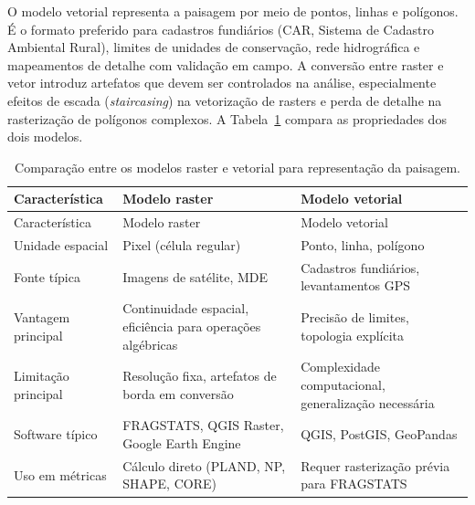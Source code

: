 \documentclass[
  portuguese,
  11pt,
  a4paper,
  open=any]{scrbook}
\begin{document}
O modelo vetorial representa a paisagem por meio de pontos, linhas e
polígonos. É o formato preferido para cadastros fundiários (CAR, Sistema
de Cadastro Ambiental Rural), limites de unidades de conservação, rede
hidrográfica e mapeamentos de detalhe com validação em campo. A
conversão entre raster e vetor introduz artefatos que devem ser
controlados na análise, especialmente efeitos de escada
(\emph{staircasing}) na vetorização de rasters e perda de detalhe na
rasterização de polígonos complexos. A Tabela~\ref{tbl-raster-vetor}
compara as propriedades dos dois modelos.

\begin{longtable}[]{@{}
  >{\raggedright\arraybackslash}p{}
  >{\raggedright\arraybackslash}p{}
  >{\raggedright\arraybackslash}p{}@{}}
\caption{Comparação entre os modelos raster e vetorial para
representação da paisagem.}\label{tbl-raster-vetor}\tabularnewline
\toprule\noalign{}
\begin{minipage}[b]{\linewidth}\raggedright
Característica
\end{minipage} & \begin{minipage}[b]{\linewidth}\raggedright
Modelo raster
\end{minipage} & \begin{minipage}[b]{\linewidth}\raggedright
Modelo vetorial
\end{minipage} \\
\midrule\noalign{}
\endfirsthead
\toprule\noalign{}
\begin{minipage}[b]{\linewidth}\raggedright
Característica
\end{minipage} & \begin{minipage}[b]{\linewidth}\raggedright
Modelo raster
\end{minipage} & \begin{minipage}[b]{\linewidth}\raggedright
Modelo vetorial
\end{minipage} \\
\midrule\noalign{}
\endhead
\bottomrule\noalign{}
\endlastfoot
Unidade espacial & Pixel (célula regular) & Ponto, linha, polígono \\
Fonte típica & Imagens de satélite, MDE & Cadastros fundiários,
levantamentos GPS \\
Vantagem principal & Continuidade espacial, eficiência para operações
algébricas & Precisão de limites, topologia explícita \\
Limitação principal & Resolução fixa, artefatos de borda em conversão &
Complexidade computacional, generalização necessária \\
Software típico & FRAGSTATS, QGIS Raster, Google Earth Engine & QGIS,
PostGIS, GeoPandas \\
Uso em métricas & Cálculo direto (PLAND, NP, SHAPE, CORE) & Requer
rasterização prévia para FRAGSTATS \\
\end{longtable}
\end{document}
